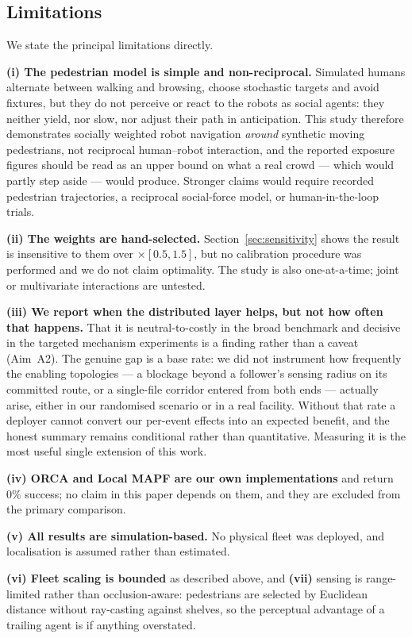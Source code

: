 \documentclass[journal]{IEEEtran}
\begin{document}
\subsection{Limitations}
We state the principal limitations directly.

\textbf{(i) The pedestrian model is simple and non-reciprocal.} Simulated humans
alternate between walking and browsing, choose stochastic targets and avoid
fixtures, but they do not perceive or react to the robots as social agents: they
neither yield, nor slow, nor adjust their path in anticipation. This study therefore
demonstrates socially weighted robot navigation \emph{around} synthetic moving
pedestrians, not reciprocal human--robot interaction, and the reported exposure
figures should be read as an upper bound on what a real crowd --- which would
partly step aside --- would produce. Stronger claims would require recorded
pedestrian trajectories, a reciprocal social-force model, or human-in-the-loop
trials.

\textbf{(ii) The weights are hand-selected.} Section~\ref{sec:sensitivity} shows the
result is insensitive to them over $\times[0.5, 1.5]$, but no calibration procedure
was performed and we do not claim optimality. The study is also one-at-a-time; joint
or multivariate interactions are untested.

\textbf{(iii) We report when the distributed layer helps, but not how often that
happens.} That it is neutral-to-costly in the broad benchmark and decisive in the
targeted mechanism experiments is a finding rather than a caveat (Aim~A2). The
genuine gap is a base rate: we did not instrument how frequently the enabling
topologies --- a blockage beyond a follower's sensing radius on its committed route,
or a single-file corridor entered from both ends --- actually arise, either in our
randomised scenario or in a real facility. Without that rate a deployer cannot
convert our per-event effects into an expected benefit, and the honest summary
remains conditional rather than quantitative. Measuring it is the most useful single
extension of this work.

\textbf{(iv) ORCA and Local MAPF are our own implementations} and return $0\%$
success; no claim in this paper depends on them, and they are excluded from the
primary comparison.

\textbf{(v) All results are simulation-based.} No physical fleet was deployed, and
localisation is assumed rather than estimated.

\textbf{(vi) Fleet scaling is bounded} as described above, and \textbf{(vii)} sensing
is range-limited rather than occlusion-aware: pedestrians are selected by Euclidean
distance without ray-casting against shelves, so the perceptual advantage of a
trailing agent is if anything overstated.
\end{document}
